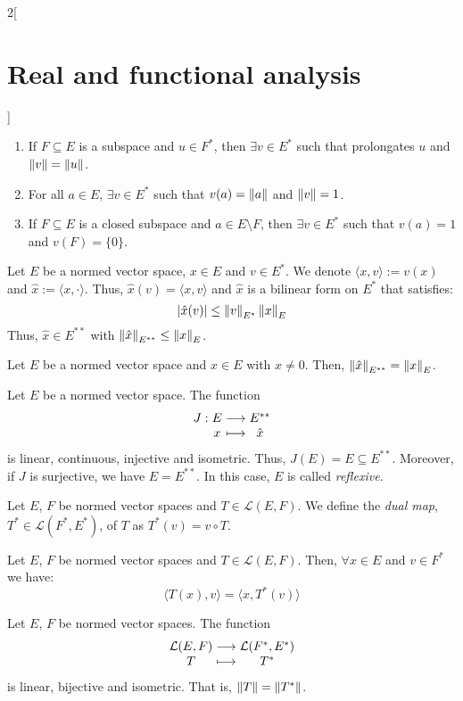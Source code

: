 \documentclass[../../../main_math.tex]{subfiles}
\begin{document}
\begin{multicols}{2}[\section{Real and functional analysis}]
\begin{theorem}
\begin{enumerate}
      \item If $F\subseteq E$ is a subspace and $u\in F^*$, then $\exists v\in E^*$ such that prolongates $u$ and $\left\|v\right\|=\left\|u\right\|$.
      \item For all $a\in E$, $\exists v\in E^*$ such that $v(a)=\left\|a\right\|$ and $\left\|v\right\|=1$.
      \item If $F\subseteq E$ is a closed subspace and $a\in E\setminus F$, then $\exists v\in E^*$ such that $v(a)=1$ and $v(F)=\{0\}$.
    \end{enumerate}
  \end{theorem}
  \begin{definition}
    Let $E$ be a normed vector space, $x\in E$ and $v\in E^*$. We denote $\langle x,v\rangle := v(x)$ and $\hat{x}:=\langle x,\cdot\rangle$. Thus, $\hat{x}(v)=\langle x,v\rangle$ and $\hat{x}$ is a bilinear form on $E^*$ that satisfies: $$\abs{\hat{x}(v)}\leq\left\|v\right\|_{E^*}\left\|x\right\|_E$$ Thus, $\hat{x}\in E^{**}$ with $\left\|\hat{x}\right\|_{E^{**}}\leq \left\|x\right\|_E$.
  \end{definition}
  \begin{proposition}
    Let $E$ be a normed vector space and $x\in E$ with $x\ne 0$. Then, $\left\|\hat{x}\right\|_{E^{**}}= \left\|x\right\|_E$.
  \end{proposition}
  \begin{proposition}
    Let $E$ be a normed vector space. The function $$\function{J}{E}{E^{**}}{x}{\hat{x}}$$ is linear, continuous, injective and isometric. Thus, $J(E)=E\subseteq E^{**}$. Moreover, if $J$ is surjective, we have $E=E^{**}$. In this case, $E$ is called \emph{reflexive}.
  \end{proposition}
  \begin{definition}
    Let $E$, $F$ be normed vector spaces and $T\in\mathcal{L}(E,F)$. We define the \emph{dual map}, $T^*\in\mathcal{L}(F^*,E^*)$, of $T$ as $T^*(v)=v\circ T$.
  \end{definition}
  \begin{proposition}
    Let $E$, $F$ be normed vector spaces and $T\in\mathcal{L}(E,F)$. Then, $\forall x\in E$ and $v\in F^*$ we have: $$\langle T(x),v\rangle=\langle x,T^*(v)\rangle$$
  \end{proposition}
  \begin{proposition}
    Let $E$, $F$ be normed vector spaces. The function $$\function{}{\mathcal{L}(E,F)}{\mathcal{L}(F^*,E^*)}{T}{T^*}$$ is linear, bijective and isometric. That is, $\left\|T\right\|=\left\|T^*\right\|$.
  \end{proposition}

\end{multicols}
\end{document}
